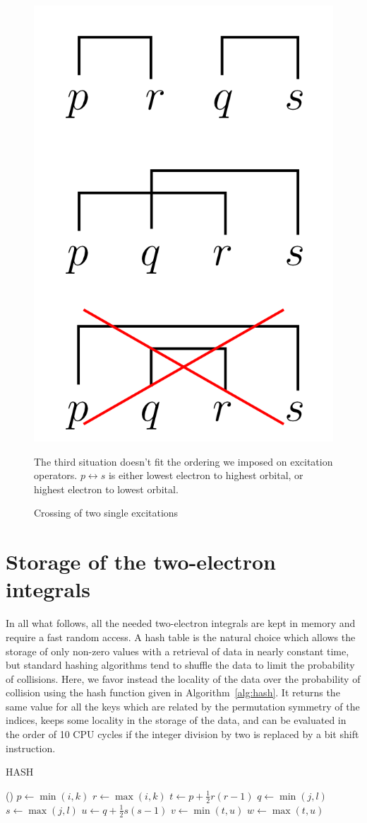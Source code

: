 \documentclass[./thesis.tex]{subfiles}
\begin{document}
\begin{figure}[h!]
	\begin{center}
		\includegraphics[width=0.4\columnwidth]{figures/determinant_driven/biphasefactor}
		\caption{
		\label{fig:biphasefactor}%
		Crossing of two single excitations
		}
		The third situation doesn't fit the ordering we imposed on excitation operators. $p \leftrightarrow s$ is either lowest electron to highest orbital, or highest electron to lowest orbital.
	\end{center}
\end{figure}



\section{Storage of the two-electron integrals}

In all what follows, all the needed two-electron integrals are kept in memory
and require a fast random access.
A hash table is the natural choice which allows the storage of only non-zero
values with a retrieval of data in nearly constant time, but standard hashing
algorithms tend to shuffle the data to limit the probability of collisions.
Here, we favor instead the locality of the data over the probability of collision
using the hash function given in Algorithm~\ref{alg:hash}.  It returns the same
value for all the keys which are related by the permutation symmetry of the
indices, keeps some locality in the storage of the data, and can be evaluated
in the order of 10 CPU cycles if the integer division by two is replaced by a
bit shift instruction.
\begin{algorithm}[H]
 \caption{HASH}
 \label{alg:hash}
\Fn(){}{
        $p \gets \min (i,k)$ \;
        $r \gets \max (i,k)$ \;
        $t \gets p + \frac{1}{2} r (r-1)$ \;
        $q \gets \min (j,l)$ \;
        $s \gets \max (j,l)$ \;
        $u \gets q + \frac{1}{2} s (s-1)$ \;
        $v \gets \min (t,u)$ \;
        $w \gets \max (t,u)$ \;
         \;
}
\end{algorithm}
\end{document}
